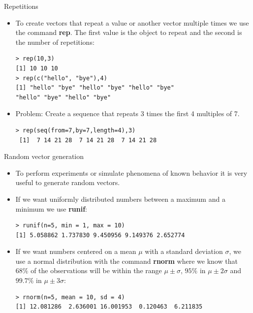 \documentclass[handout]{beamer}
\begin{document}
\begin{frame}[fragile]{Repetitions}
\scriptsize{
\begin{itemize}
 \item To create vectors that repeat a value or another vector multiple times we use the command \textbf{rep}. The first value is the object to repeat and the second is the number of repetitions:
 \begin{verbatim}
> rep(10,3)
[1] 10 10 10
> rep(c("hello", "bye"),4)
[1] "hello" "bye" "hello" "bye" "hello" "bye"
"hello" "bye" "hello" "bye"
 \end{verbatim}
  \item Problem: Create a sequence that repeats 3 times the first 4 multiples of 7.
 \begin{verbatim}
> rep(seq(from=7,by=7,length=4),3)
 [1]  7 14 21 28  7 14 21 28  7 14 21 28
\end{verbatim}
 
 
\end{itemize}
 
 
 
} 
\end{frame}

\begin{frame}[fragile]{Random vector generation}
\scriptsize{
\begin{itemize}
 \item To perform experiments or simulate phenomena of known behavior it is very useful to generate random vectors.
 \item  If we want uniformly distributed numbers between a maximum and a minimum we use \textbf{runif}:
 \begin{verbatim}
> runif(n=5, min = 1, max = 10)
[1] 5.058862 1.737830 9.450956 9.149376 2.652774
 \end{verbatim}
 \item  If we want numbers centered on a mean $\mu$ with a standard deviation $\sigma$, we use a normal distribution with the command \textbf{rnorm} where we know that $68\%$  of the observations will be within the range $\mu\pm\sigma$, $95\%$ in $\mu\pm2\sigma$ and $99.7\%$ in $\mu\pm3\sigma$:
 
 \begin{verbatim}
> rnorm(n=5, mean = 10, sd = 4)
[1] 12.081286  2.636001 16.001953  0.120463  6.211835
 \end{verbatim}
 
\end{itemize}

}
\end{frame}
\end{document}
